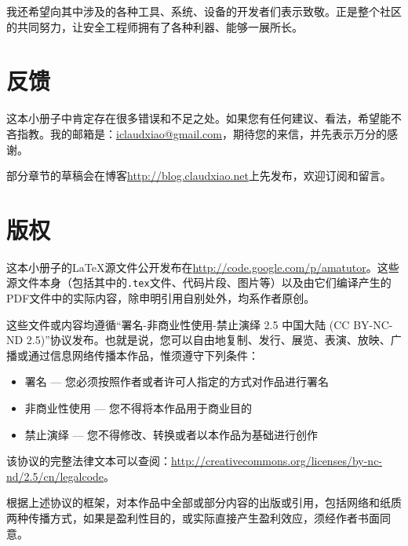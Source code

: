 我还希望向其中涉及的各种工具、系统、设备的开发者们表示致敬。正是整个社区的共同努力，让安全工程师拥有了各种利器、能够一展所长。

\section*{反馈}
这本小册子中肯定存在很多错误和不足之处。如果您有任何建议、看法，希望能不吝指教。我的邮箱是：\href{mailto:iclaudxiao@gmail.com}{iclaudxiao@gmail.com}，期待您的来信，并先表示万分的感谢。

部分章节的草稿会在博客\url{http://blog.claudxiao.net}上先发布，欢迎订阅和留言。

\section*{版权}
这本小册子的{\LaTeX}源文件公开发布在\url{http://code.google.com/p/amatutor}。这些源文件本身（包括其中的\lstinline!.tex!文件、代码片段、图片等）以及由它们编译产生的PDF文件中的实际内容，除申明引用自别处外，均系作者原创。

这些文件或内容均遵循“署名-非商业性使用-禁止演绎 2.5 中国大陆 (CC BY-NC-ND 2.5)”协议发布。也就是说，您可以自由地复制、发行、展览、表演、放映、广播或通过信息网络传播本作品，惟须遵守下列条件：

\begin{itemize}
  \item 署名 — 您必须按照作者或者许可人指定的方式对作品进行署名
  \item 非商业性使用 — 您不得将本作品用于商业目的
  \item 禁止演绎 — 您不得修改、转换或者以本作品为基础进行创作
\end{itemize}

该协议的完整法律文本可以查阅：\url{http://creativecommons.org/licenses/by-nc-nd/2.5/cn/legalcode}。

根据上述协议的框架，对本作品中全部或部分内容的出版或引用，包括网络和纸质两种传播方式，如果是盈利性目的，或实际直接产生盈利效应，须经作者书面同意。

